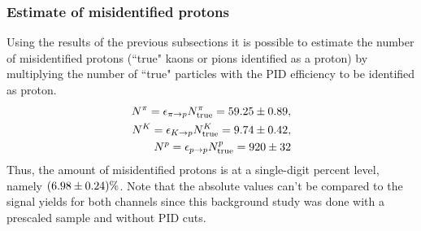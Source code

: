 \subsubsection{Estimate of misidentified protons}
Using the results of the previous subsections it is possible to estimate the number of misidentified protons (``true" kaons or pions identified as a proton) by multiplying the number of ``true" particles  with the PID efficiency  to be identified as proton. 
\begin{align}
    N^{\pi} = \epsilon_{{\pi}\rightarrow{{\ensuremath{p}}}} N_{\text{true}}^{\pi}             = 59.25 \pm 0.89, \\  
    N^{{K}} = \epsilon_{{{K}}\rightarrow{{\ensuremath{p}}}} N_{\text{true}}^{{K}}       = 9.74 \pm 0.42, \\ 
    N^{{p}} = \epsilon_{{{p}}\rightarrow{{\ensuremath{p}}}} N_{\text{true}}^{{p}} = 920 \pm 32 
\end{align}
Thus, the amount of misidentified protons is at a single-digit percent level, namely $(6.98 \pm 0.24)\%$. 
Note that the absolute values can't be compared to the signal yields for both channels since this background study was done with a prescaled sample and without PID cuts.



\begin{table}
\caption{\label{tab:Backgrounds}Estimate of the residual peaking backgrounds.}
\end{table}


